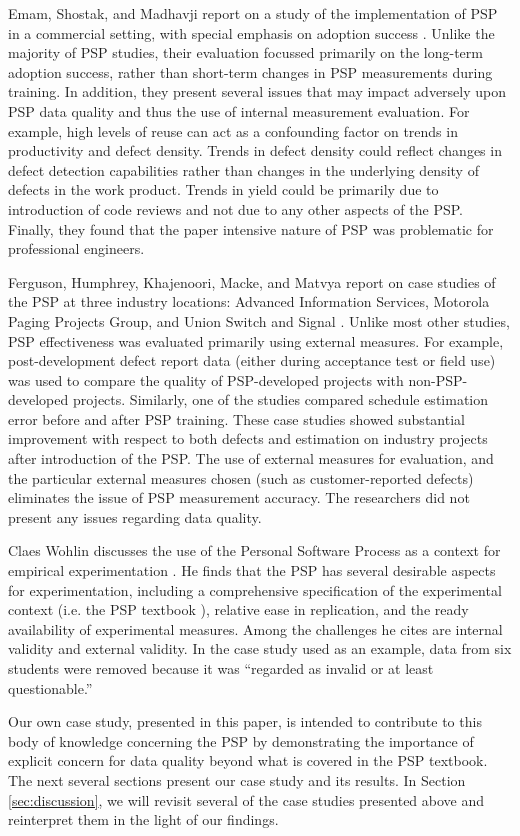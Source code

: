 Emam, Shostak, and Madhavji report on a study of the implementation of PSP
in a commercial setting, with special emphasis on adoption success
\cite{Emam96}.  Unlike the majority of PSP studies, their evaluation
focussed primarily on the long-term adoption success, rather than
short-term changes in PSP measurements during training.  In addition, they
present several issues that may impact adversely upon PSP data quality and
thus the use of internal measurement evaluation. For example, high levels
of reuse can act as a confounding factor on trends in productivity
and defect density.  Trends in defect density could reflect changes
in defect detection capabilities rather than changes in the underlying
density of defects in the work product. Trends in yield could be 
primarily due to introduction of code reviews and not due to any other
aspects of the PSP.   Finally, they found that the paper intensive nature
of PSP was problematic for professional engineers.


Ferguson, Humphrey, Khajenoori, Macke, and Matvya report on case studies of
the PSP at three industry locations: Advanced Information Services,
Motorola Paging Projects Group, and Union Switch and Signal
\cite{Ferguson97}.  Unlike most other studies, PSP effectiveness was
evaluated primarily using external measures.  For example, post-development
defect report data (either during acceptance test or field use) was used to
compare the quality of PSP-developed projects with non-PSP-developed
projects.  Similarly, one of the studies compared schedule estimation error
before and after PSP training.  These case studies showed substantial 
improvement with respect to both defects and estimation on industry 
projects after introduction of the PSP.   The use of external measures
for evaluation, and the particular external measures chosen (such as 
customer-reported defects) eliminates the issue of PSP measurement
accuracy. The researchers did not present any issues regarding 
data quality. 

Claes Wohlin discusses the use of the Personal Software Process as
a context for empirical experimentation \cite{Wohlin98a}.  He finds that
the PSP has several desirable aspects for experimentation, including a
comprehensive specification of the experimental context (i.e. the PSP
textbook \cite{Humphrey95}), relative ease in replication, and the ready
availability of experimental measures. Among the challenges he cites are
internal validity and external validity.  In the case study used as an
example, data from six students were removed because it was ``regarded as
invalid or at least questionable.''

Our own case study, presented in this paper, is intended to contribute to
this body of knowledge concerning the PSP by demonstrating the importance
of explicit concern for data quality beyond what is covered in the PSP
textbook.  The next several sections present our case study and its
results.  In Section \ref{sec:discussion}, we will revisit several of the
case studies presented above and reinterpret them in the light of our
findings. 

